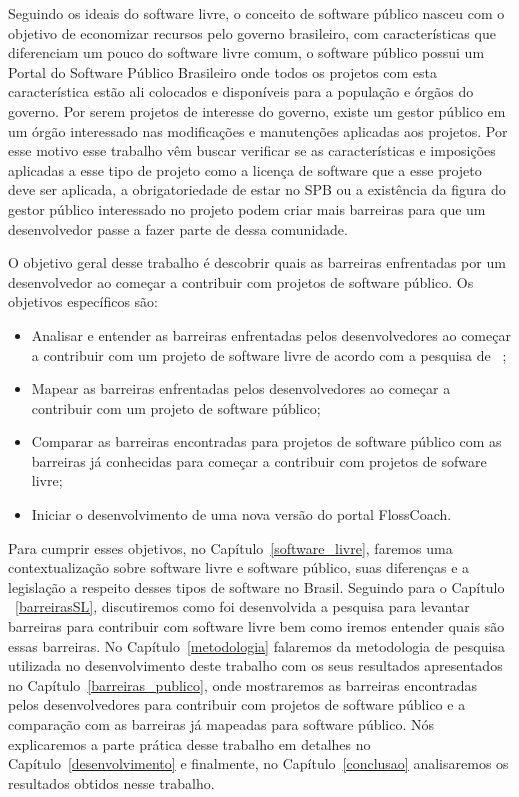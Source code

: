 Seguindo os ideais do software livre, o conceito de software público nasceu com o
objetivo de economizar recursos pelo governo brasileiro, com características que 
diferenciam um pouco do software livre comum, o software público possui um
Portal do Software Público Brasileiro onde todos os projetos com esta característica
estão ali colocados e disponíveis para a população e órgãos do governo. Por serem
projetos de interesse do governo, existe um gestor público em um órgão interessado 
nas modificações e manutenções aplicadas aos projetos. Por esse motivo esse trabalho 
vêm buscar verificar se as características e imposições aplicadas a esse tipo de projeto 
como a licença de software que a esse projeto deve ser aplicada, a obrigatoriedade de
estar no SPB ou a existência da figura do gestor público interessado no projeto podem
criar mais barreiras para que um desenvolvedor passe a fazer parte de dessa comunidade.


O objetivo geral desse trabalho é descobrir quais as barreiras enfrentadas por um 
desenvolvedor ao começar a contribuir com projetos de software público.
Os objetivos específicos são:

\begin{itemize}
\item Analisar e entender as barreiras enfrentadas pelos desenvolvedores ao começar
a contribuir com um projeto de software livre de acordo com a pesquisa de ~;
\item Mapear as barreiras enfrentadas pelos desenvolvedores ao começar a contribuir
com um projeto de software público;
\item Comparar as barreiras encontradas para projetos de software público com as barreiras já conhecidas para começar 
a contribuir com projetos de sofware livre;
\item Iniciar o desenvolvimento de uma nova versão do portal FlossCoach.
\end{itemize}

Para cumprir esses objetivos, no Capítulo~\ref{software_livre}, faremos uma 
contextualização sobre software livre e software público, suas diferenças e a 
legislação a respeito desses tipos de software no Brasil. Seguindo para o Capítulo
~\ref{barreirasSL}, discutiremos como foi desenvolvida a pesquisa para levantar
barreiras para contribuir com software livre bem como iremos entender quais são
essas barreiras. No Capítulo~\ref{metodologia} falaremos da metodologia de pesquisa
utilizada no desenvolvimento deste trabalho com os seus resultados apresentados no
Capítulo~\ref{barreiras_publico}, onde mostraremos as barreiras encontradas pelos
desenvolvedores para contribuir com projetos de software público e a comparação com 
as barreiras já mapeadas para software público. Nós explicaremos a parte prática desse
trabalho em detalhes no Capítulo~\ref{desenvolvimento} e finalmente, no Capítulo~\ref{conclusao}
analisaremos os resultados obtidos nesse trabalho.



